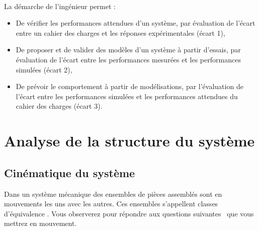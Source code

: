 


 \\

\graphicspath{{../../img/}}
\begin{center}
\def\svgwidth{\columnwidth}

\end{center}

La démarche de l’ingénieur permet :
\begin{itemize}
 \item De vérifier les performances attendues d’un système, par évaluation de l’écart entre un cahier des charges et les réponses expérimentales (écart 1),
 \item De proposer et de valider des modèles d’un système à partir d’essais, par évaluation de l’écart entre les performances mesurées et les performances simulées (écart 2),
 \item De prévoir le comportement à partir de modélisations, par l’évaluation de l’écart entre les performances simulées et les performances attendues du cahier des charges (écart 3).
\end{itemize}


\newpage

\section{Analyse de la structure du système}

\subsection{Cinématique du système}

Dans un système mécanique des ensembles de pièces assemblés sont en mouvements les uns avec les autres. Ces ensembles s'appellent \og classes d'équivalence \fg. Vous observerez pour répondre aux questions suivantes \lesysteme \ que vous mettrez en mouvement.

